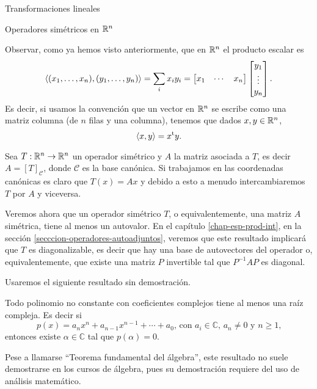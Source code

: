 \begin{chapter}{Transformaciones lineales}
\begin{section}{Operadores simétricos en $\mathbb R^n$}
    
    Observar, como ya hemos visto anteriormente,  que en $\mathbb R^n$ el producto escalar es 
    \begin{equation*}
        \langle (x_1,\ldots,x_n),(y_1,\ldots,y_n)  \rangle = \sum_i x_iy_i = \begin{bmatrix} x_1& \cdots &x_n\end{bmatrix}\begin{bmatrix} y_1 \\ \vdots \\ y_n \end{bmatrix}.
    \end{equation*}
    Es decir, si usamos la convención que un vector en $\mathbb R^n$  se escribe como una matriz columna (de $n$ filas y una columna),  tenemos que dados $x,y \in \mathbb R^n$, 
    \begin{equation*}
        \langle x,y \rangle = x^{\operatorname{t}} y.
    \end{equation*}
    
Sea $T:\mathbb R^n \to \mathbb R^n$ un operador simétrico y $A$ la matriz asociada a  $T$,  es decir $A = [T]_{\mathcal{C}}$,  donde $\mathcal{C}$  es la base canónica. Si trabajamos en las coordenadas canónicas es claro que $T(x) = Ax$ y debido a esto a menudo intercambiaremos  $T$ por $A$ y viceversa.  

 
    Veremos ahora que un operador simétrico $T$, o equivalentemente, una matriz $A$ simétrica, tiene al menos un autovalor. En el capítulo \ref{chap-esp-prod-int}, en la sección \ref{secccion-operadores-autoadjuntos}, veremos que este resultado implicará que $T$ es diagonalizable, es decir que hay una base de autovectores del operador o, equivalentemente, que existe una matriz $P$ invertible tal que $P^{-1}AP$ es diagonal. 
    
    Usaremos el siguiente resultado sin demostración.
    
    \begin{teorema}\label{th-fundamental-del-algebra}
        Todo polinomio no constante con coeficientes complejos tiene al menos una raíz compleja. Es decir si 
        \begin{equation*}
            \text{$p(x) = a_nx^n+ a_{n-1}x^{n-1} +\cdots+a_0$, con $a_i \in \mathbb{C}$,  $a_n\ne 0$ y $n\ge 1$,}
        \end{equation*}
        entonces existe $\alpha \in \mathbb{C}$ tal que $p(\alpha)=0$.
    \end{teorema}

    Pese a llamarse ``Teorema fundamental del álgebra'', este resultado  no suele demostrarse en los cursos de álgebra, pues su demostración requiere del uso de análisis matemático.
    

\end{section}
\end{chapter}
